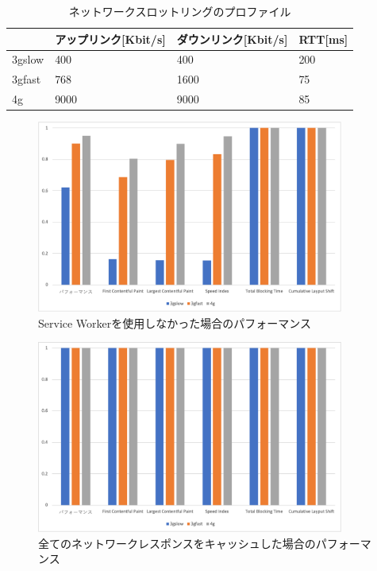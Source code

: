 \begin{table}
  \caption{ネットワークスロットリングのプロファイル}\label{table:ネットワークスロットリングのプロファイル}
  \centering
  \begin{tabular}{|p{5em}|p{10em}|p{10em}|p{10em}|}
    \hline
    & アップリンク[Kbit/s] & ダウンリンク[Kbit/s] & RTT[ms] \\ \hline
    3gslow & 400 & 400 & 200 \\ \hline
    3gfast & 768 & 1600 & 75 \\ \hline
    4g & 9000 & 9000 & 85 \\ \hline
  \end{tabular}
\end{table}

\begin{figure}
  \centering
  \includegraphics[width=0.9\textwidth]{images/without_service_worker.png}
  \caption{Service Workerを使用しなかった場合のパフォーマンス}\label{figure:Service Workerを使用しなかった場合のパフォーマンス}
\end{figure}

\begin{figure}
  \centering
  \includegraphics[width=0.9\textwidth]{images/service_worker_cache_all.png}
  \caption{全てのネットワークレスポンスをキャッシュした場合のパフォーマンス}\label{figure:全てのネットワークレスポンスをキャッシュした場合のパフォーマンス}
\end{figure}

